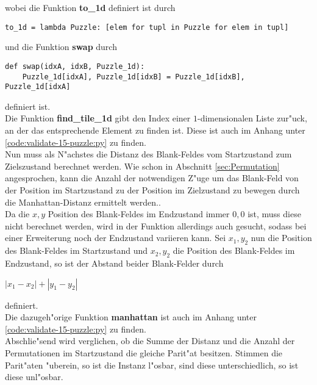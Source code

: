 wobei die Funktion \textbf{to\_1d} definiert ist durch
\vspace{.25cm}
\begin{verbatim}
to_1d = lambda Puzzle: [elem for tupl in Puzzle for elem in tupl]
\end{verbatim}
\vspace{.25cm}
und die Funktion \textbf{swap} durch
\vspace{.25cm}
\begin{verbatim}
def swap(idxA, idxB, Puzzle_1d):
    Puzzle_1d[idxA], Puzzle_1d[idxB] = Puzzle_1d[idxB], Puzzle_1d[idxA]
\end{verbatim}
\vspace{.25cm}
definiert ist.\\
Die Funktion \textbf{find\_tile\_1d} gibt den Index einer $1$-dimensionalen Liste zur"uck, an der das entsprechende Element zu finden ist. Diese ist auch im Anhang unter \ref{code:validate-15-puzzle:py} zu finden.\\
Nun muss als N"achstes die Distanz des Blank-Feldes vom Startzustand zum Zielszustand berechnet werden. Wie schon in Abschnitt \ref{sec:Permutation} angesprochen, kann die Anzahl der notwendigen Z"uge um das Blank-Feld von der Position im Startzustand zu der Position im Zielzustand zu bewegen durch die Manhattan-Distanz ermittelt werden..\\ Da die $x,y$ Position des Blank-Feldes im Endzustand immer $0,0$ ist, muss diese nicht berechnet werden, wird in der Funktion allerdings auch gesucht, sodass bei einer Erweiterung noch der Endzustand variieren kann.
Sei $x_1,y_2$ nun die Position des Blank-Feldes im Startzustand und $x_2,y_2$ die Position des Blank-Feldes im Endzustand, so ist der Abstand beider Blank-Felder durch \\
\begin{center}
    $\left | x_1 - x_2 \right | + \left | y_1 - y_2 \right |$
\end{center}
definiert.\\
Die dazugeh"orige Funktion \textbf{manhattan} ist auch im Anhang unter \ref{code:validate-15-puzzle:py} zu finden.\\
Abschlie"send wird verglichen, ob die Summe der Distanz und die Anzahl der Permutationen im Startzustand die gleiche Parit"at besitzen. Stimmen die Parit"aten "uberein, so ist die Instanz l"osbar, sind diese unterschiedlich, so ist diese unl"osbar.


